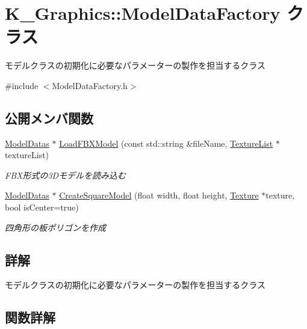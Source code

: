 \hypertarget{class_k___graphics_1_1_model_data_factory}{}\section{K\+\_\+\+Graphics\+:\+:Model\+Data\+Factory クラス}
\label{class_k___graphics_1_1_model_data_factory}


モデルクラスの初期化に必要なパラメーターの製作を担当するクラス  




{\ttfamily \#include $<$Model\+Data\+Factory.\+h$>$}

\subsection*{公開メンバ関数}
\begin{DoxyCompactItemize}
\item 
\mbox{\hyperlink{struct_k___graphics_1_1_model_datas}{Model\+Datas}} $\ast$ \mbox{\hyperlink{class_k___graphics_1_1_model_data_factory_a09661487ad0f3a9c563db193d6e12e08}{Load\+F\+B\+X\+Model}} (const std\+::string \&file\+Name, \mbox{\hyperlink{class_k___graphics_1_1_texture_list}{Texture\+List}} $\ast$texture\+List)
\begin{DoxyCompactList}\small\item\em F\+B\+X形式の3\+Dモデルを読み込む \end{DoxyCompactList}\item 
\mbox{\hyperlink{struct_k___graphics_1_1_model_datas}{Model\+Datas}} $\ast$ \mbox{\hyperlink{class_k___graphics_1_1_model_data_factory_a01cb97a34c9f12ba7ae9270dc86b2644}{Create\+Square\+Model}} (float width, float height, \mbox{\hyperlink{class_k___graphics_1_1_texture}{Texture}} $\ast$texture, bool is\+Center=true)
\begin{DoxyCompactList}\small\item\em 四角形の板ポリゴンを作成 \end{DoxyCompactList}\end{DoxyCompactItemize}


\subsection{詳解}
モデルクラスの初期化に必要なパラメーターの製作を担当するクラス 

\subsection{関数詳解}
\mbox{\label{class_k___graphics_1_1_model_data_factory_a01cb97a34c9f12ba7ae9270dc86b2644}} 
